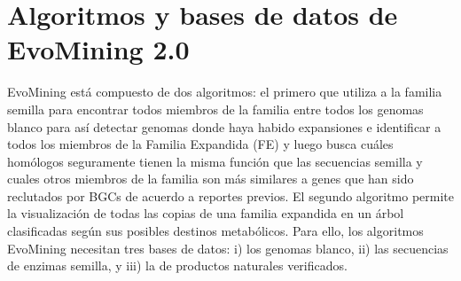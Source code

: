 \documentclass[12pt,twoside]{reedthesis}
\begin{document}
  \section{Algoritmos y bases de datos de EvoMining
  2.0}\label{algoritmos-y-bases-de-datos-de-evomining-2.0}
  
  EvoMining está compuesto de dos algoritmos: el primero que utiliza a la
  familia semilla para encontrar todos miembros de la familia entre todos
  los genomas blanco para así detectar genomas donde haya habido
  expansiones e identificar a todos los miembros de la Familia Expandida
  (FE) y luego busca cuáles homólogos seguramente tienen la misma función
  que las secuencias semilla y cuales otros miembros de la familia son más
  similares a genes que han sido reclutados por BGCs de acuerdo a reportes
  previos. El segundo algoritmo permite la visualización de todas las
  copias de una familia expandida en un árbol clasificadas según sus
  posibles destinos metabólicos. Para ello, los algoritmos EvoMining
  necesitan tres bases de datos: i) los genomas blanco, ii) las secuencias
  de enzimas semilla, y iii) la de productos naturales verificados.
  
\end{document}
